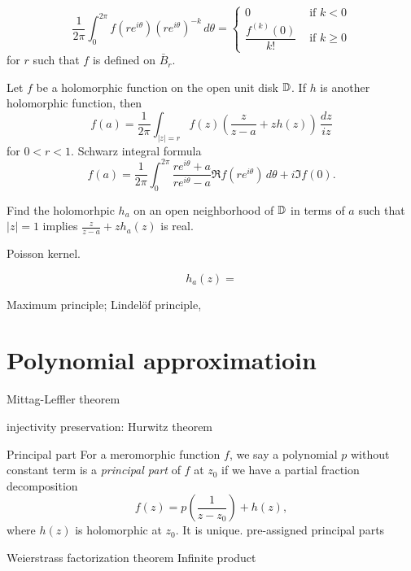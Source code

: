 \documentclass{../../large}
\begin{document}
\begin{prb}
\[\frac1{2\pi}\int_0^{2\pi}f(re^{i\theta})(re^{i\theta})^{-k}\,d\theta
=\begin{cases}0&\text{ if }k<0\\\dfrac{f^{(k)}(0)}{k!}&\text{ if }k\ge0\end{cases}\]
for $r$ such that $f$ is defined on $\bar B_r$.
\end{prb}
\begin{prb}
Let $f$ be a holomorphic function on the open unit disk $\mathbb{D}$.
If $h$ is another holomorphic function, then
\[f(a)=\frac1{2\pi}\int_{|z|=r}f(z)\left(\frac z{z-a}+zh(z)\right)\,\frac{dz}{iz}\]
for $0<r<1$.
Schwarz integral formula
\[f(a)=\frac1{2\pi}\int_0^{2\pi}\frac{re^{i\theta}+a}{re^{i\theta}-a}\Re f(re^{i\theta})\,d\theta+i\Im f(0).\]
\begin{parts}
\item Find the holomorhpic $h_a$ on an open neighborhood of $\mathbb{D}$ in terms of $a$ such that $|z|=1$ implies $\frac z{z-a}+zh_a(z)$ is real.
\item Poisson kernel.
\end{parts}
\end{prb}
\begin{pf}
\[h_a(z)=\]
\end{pf}




Maximum principle; Lindelöf principle,


\section{Polynomial approximatioin}

Mittag-Leffler theorem
\begin{prb}
\begin{parts}
\item injectivity preservation: Hurwitz theorem
\end{parts}
\end{prb}

Principal part
For a meromorphic function $f$, we say a polynomial $p$ without constant term is a \emph{principal part} of $f$ at $z_0$ if we have a partial fraction decomposition
\[f(z)=p\left(\frac1{z-z_0}\right)+h(z),\]
where $h(z)$ is holomorphic at $z_0$.
It is unique.
pre-assigned principal parts

Weierstrass factorization theorem
Infinite product
\end{document}
